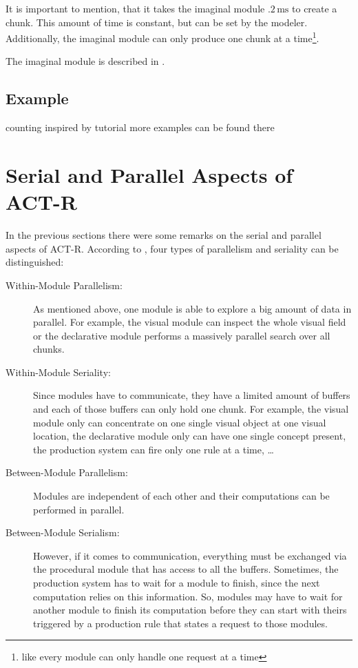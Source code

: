 It is important to mention, that it takes the imaginal module $.2\,\mathrm{ms}$ to create a chunk. This amount of time is constant, but can be set by the modeler. Additionally, the imaginal module can only produce one chunk at a time\footnote{like every module can only handle one request at a time}.

The imaginal module is described in \cite[unit 2]{actr_tutorial}.

\subsection{Example}

counting
inspired by tutorial
more examples can be found there

\section{Serial and Parallel Aspects of ACT-R}

In the previous sections there were some remarks on the serial and parallel aspects of ACT-R. According to \cite[p. 68]{anderson_how_2007}, four types of parallelism and seriality can be distinguished:

\begin{description}
 \item[Within-Module Parallelism:] As mentioned above, one module is able to explore a big amount of data in parallel. For example, the visual module can inspect the whole visual field or the declarative module performs a massively parallel search over all chunks.
 \item[Within-Module Seriality:] Since modules have to communicate, they have a limited amount of buffers and each of those buffers can only hold one chunk. For example, the visual module only can concentrate on one single visual object at one visual location, the declarative module only can have one single concept present, the production system can fire only one rule at a time, \dots 
 \item[Between-Module Parallelism:] Modules are independent of each other and their computations can be performed in parallel.
 \item[Between-Module Serialism:] However, if it comes to communication, everything must be exchanged via the procedural module that has access to all the buffers. Sometimes, the production system has to wait for a module to finish, since the next computation relies on this information. So, modules may have to wait for another module to finish its computation before they can start with theirs triggered by a production rule that states a request to those modules.
\end{description}

